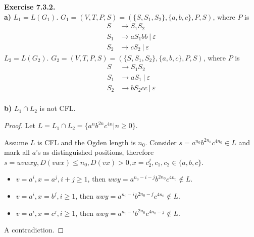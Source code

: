 \documentclass[a4paper]{article}
\newtheorem*{proof}{Proof}
\newenvironment{exercise}[1]{
	\par
	\noindent\textbf{Exercise #1.}\quad
}{
	\par
	\bigskip
}
\newcommand{\dv}{\ |\ }
\begin{document}
\begin{exercise}{7.3.2}\hspace{0pt}\\
\textbf{a)}
    $L_1=L(G_1)$. $G_1=(V,T,P,S)=(\{S,S_1,S_2\},\{a,b,c\},P,S)$, where $P$ is
    \begin{align*}
        S &\to S_1S_2\\
        S_1 &\to aS_1bb\dv\varepsilon\\
        S_2 &\to cS_2\dv\varepsilon
    \end{align*}
    $L_2=L(G_2)$. $G_2=(V,T,P,S)=(\{S,S_1,S_2\},\{a,b,c\},P,S)$, where $P$ is
    \begin{align*}
        S &\to S_1S_2\\
        S_1 &\to aS_1\dv\varepsilon\\
        S_2 &\to bS_2cc\dv\varepsilon
    \end{align*}\\
\textbf{b)}
    $L_1\cap L_2$ is not CFL.
    \begin{proof}
        Let $L=L_1\cap L_2=\{a^nb^{2n}c^{4n}|n\geqslant 0\}$.\par
        Assume $L$ is CFL and the Ogden length is $n_0$.
        Consider $s=a^{n_0}b^{2n_0}c^{4n_0}\in L$ and mark all $a$'s as distinguished positions, therefore
        $s=uvwxy,D(vwx)\leqslant n_0,D(vx)>0,x=c_2^j,c_1,c_2\in\{a,b,c\}$.
        \begin{itemize}
            \item $v=a^i,x=a^j,i+j\geqslant 1$, then $uwy=a^{n_0-i-j}b^{2n_0}c^{4n_0}\notin L$.
            \item $v=a^i,x=b^j,i\geqslant 1$, then $uwy=a^{n_0-i}b^{2n_0-j}c^{4n_0}\notin L$.
            \item $v=a^i,x=c^j,i\geqslant 1$, then $uwy=a^{n_0-i}b^{2n_0}c^{4n_0-j}\notin L$.
        \end{itemize}
        A contradiction.
    \end{proof}
\end{exercise}
\end{document}
